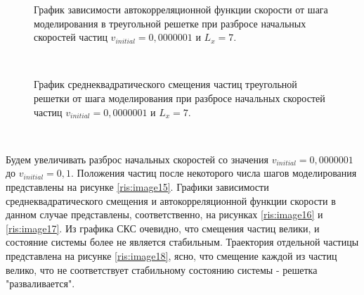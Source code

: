 \documentclass[14pt,a4paper,report]{ncc}
\begin{document}
\begin{figure}[]
\caption{График зависимости автокорреляционной функции скорости от шага моделирования в треугольной решетке при разбросе начальных скоростей частиц $v_{initial} = 0,0000001 $ и  $L_x=7$.}
\label{ris:image13}
\end{figure}
\

\begin{figure}[]
\caption{График среднеквадратического смещения частиц треугольной решетки от шага моделирования при разбросе начальных скоростей частиц  $v_{initial} = 0,0000001 $ и  $L_x=7$.}
\label{ris:image14}
\end{figure}
\




Будем увеличивать разброс начальных скоростей со значения $v_{initial} = 0,0000001 $ до  $v_{initial} = 0,1 $. Положения частиц после некоторого числа шагов моделирования представлены на рисунке \ref{ris:image15}. Графики зависимости среднеквадратического смещения и автокорреляционной функции скорости в данном случае представлены, соответственно, на рисунках \ref{ris:image16} и \ref{ris:image17}. Из графика СКС очевидно, что смещения частиц велики, и состояние системы более не является стабильным. Траектория отдельной частицы представлена на рисунке \ref{ris:image18}, ясно, что смещение каждой из частиц велико, что не соответствует стабильному состоянию системы - решетка "разваливается".
\end{document}
